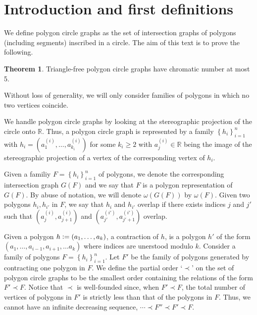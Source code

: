\documentclass[12pt]{article}
\theoremstyle{definition}
\newtheorem{thm}{Theorem}
\newcommand{\defeq}{\vcentcolon=}
\begin{document}
    \section{Introduction and first definitions}

    We define polygon circle
    graphs as the set of intersection
    graphs of polygons
    (including segments)
    inscribed in a circle.
    The aim of this text is to
    prove the following.

    \begin{thm} \label{thm:main}
        Triangle-free
        polygon circle graphs
        have chromatic number at
        most 5.
    \end{thm}

    Without loss of generality,
    we will only consider
    families of polygons
    in which no two
    vertices coincide.

    We handle polygon
    circle graphs by looking
    at the stereographic projection
    of the circle onto $\mathbb{R}$.
    Thus, a polygon circle
    graph is represented by a 
    family $\left\{h_{i}\right\}_{i=1}^{n}$
    with 
    $h_{i} = \left(a_{1}^{\left(i\right)},
    \ldots, a_{k_{i}}^{\left(i\right)}\right)$ 
    for some $k_{i} \geq 2$ 
    with $a^{\left(i\right)}_{j} \in \mathbb{R}$
    being the image of
    the stereographic projection
    of a vertex of
    the corresponding 
    vertex of $h_{i}$.

    Given a familiy
    $F = \left\{h_{i}\right\}_{i=1}^{n}$ 
    of polygons, we denote
    the corresponding
    intersection graph $G\left(F\right)$
    and we say that
    $F$ is a polygon
    representation
    of $G\left(F\right)$.
    By abuse of notation,
    we will denote
    $\omega\left(G\left(F\right)\right)$ 
    by $\omega\left(F\right)$.
    Given two polygons
    $h_{i}, h_{i'}$ in $F$,
    we say that $h_{i}$ and
    $h_{i'}$ overlap 
    if there exists indices 
    $j$ and $j'$ such that
    $\left(a_{j}^{\left(i\right)},
     a_{j+1}^{\left(i\right)}\right)$ 
     and $\left(a_{j'}^{\left(i'\right)},
     a_{j'+1}^{\left(i'\right)}\right)$ 
     overlap.

     Given a polygon
     $h \defeq \left(
     a_{1}, \ldots, a_{k}\right)$,
     a contraction of $h$,
     is a polygon $h'$ 
     of the form
     $\left(a_{1}, \ldots,
     a_{i-1}, a_{i+1}, \ldots
     a_{k}\right)$ 
     where indices are
     unerstood modulo $k$.
     Consider a family of
     polygons
     $F = \left\{h_{i}\right\}_{i=1}^{n}$.
     Let $F'$ be the family
     of polygons generated
     by contracting one
     polygon in $F$.
     We define the partial order
     `$\prec$' on the set
     of polygon circle graphs
     to be the smallest order
     containing
     the relations of the
     form $F' \prec F$.
     Notice that $\prec$ is
     well-founded since,
     when $F' \prec F$,
     the total number of 
     vertices of polygons in
     $F'$ is strictly less than
     that of the polygons in $F$.
     Thus, we cannot have an
     infinite decreasing sequence,
     $\cdots \prec F'' \prec F' \prec F$.
\end{document}
